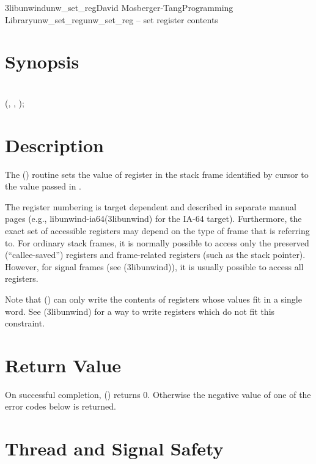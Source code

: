 \documentclass{article}
\begin{document}
\begin{Name}{3libunwind}{unw\_set\_reg}{David Mosberger-Tang}{Programming Library}{unw\_set\_reg}unw\_set\_reg -- set register contents
\end{Name}

\section{Synopsis}

\\

 (,  ,  );\\

\section{Description}

The () routine sets the value of register
 in the stack frame identified by cursor  to the
value passed in .

The register numbering is target dependent and described in separate
manual pages (e.g., libunwind-ia64(3libunwind) for the IA-64 target).
Furthermore, the exact set of accessible registers may depend on the
type of frame that  is referring to.  For ordinary stack
frames, it is normally possible to access only the preserved
(``callee-saved'') registers and frame-related registers (such as the
stack pointer).  However, for signal frames (see
(3libunwind)), it is usually possible to access
all registers.

Note that () can only write the contents of
registers whose values fit in a single word.  See
(3libunwind) for a way to write registers which do not
fit this constraint.

\section{Return Value}

On successful completion, () returns 0.
Otherwise the negative value of one of the error codes below is
returned.

\section{Thread and Signal Safety}
\end{document}
